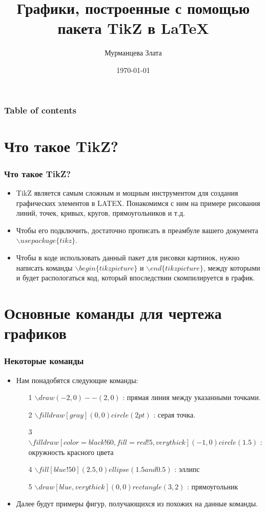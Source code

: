 \documentclass{beamer}
\theoremstyle{plain}
\begin{document}
\title{Графики, построенные с помощью пакета TikZ в LaTeX}

\author{Мурманцева Злата}
\date{\today} 
\begin{frame}
\titlepage
\end{frame}

\begin{frame}\frametitle{Table of contents}\tableofcontents
\end{frame} 


\section{Что такое TikZ?} 
\begin{frame}\frametitle{Что такое TikZ?} 

\begin{itemize}
\item TikZ является самым сложным и мощным инструментом для создания графических элементов в LATEX. Понакомимся с ним на примере рисования линий, точек, кривых, кругов, прямоугольников и т.д. \pause
\item Чтобы его подключить, достаточно прописать в преамбуле вашего документа $\backslash usepackage\{tikz\}$. \pause
\item Чтобы в коде использовать данный пакет для рисовки картинок, нужно написать команды $\backslash begin\{tikzpicture\}$ и  $\backslash end\{tikzpicture\}$, между которыми и будет распологаться код, который впоследствии скомпилируется в график.
\end{itemize}

\end{frame}
\section{Основные команды для чертежа графиков }
\begin{frame} \frametitle{Некоторые команды}
\begin{itemize}
\item Нам понадобятся следующие команды:
      \begin{itemize}
    \item[1] $\backslash draw (-2,0) -- (2,0)$ : прямая линия между указанными точками.
    \item[2] $\backslash filldraw [gray] (0,0) circle (2pt)$ : серая точка.
    \item[3] $\backslash filldraw[color=black!60, fill=red!5, very thick](-1,0) circle (1.5)$ : окружность красного цвета
    \item[4] $\backslash fill[blue!50] (2.5,0) ellipse (1.5 and 0.5)$ : эллипс
    \item[5] $\backslash draw[blue, very thick] (0,0) rectangle (3,2)$ : прямоугольник
    \end{itemize}
    \item Далее будут примеры фигур, получающихся из похожих на данные команды.
    
\end{itemize}
\end{frame}
\end{document}
